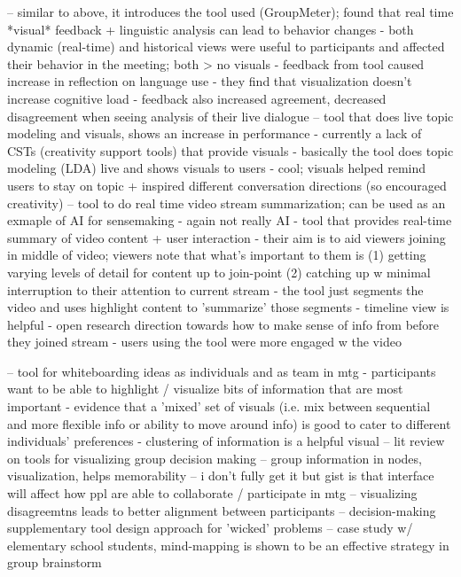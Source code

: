 \cite{leshedVisualizingRealtimeLanguagebased2009} -- similar to above, it introduces the tool used (GroupMeter); found that real time *visual* feedback + linguistic analysis can lead to behavior changes
    - both dynamic (real-time) and historical views were useful to participants and affected their behavior in the meeting; both > no visuals
    - feedback from tool caused increase in reflection on language use
    - they find that visualization doesn't increase cognitive load
    - feedback also increased agreement, decreased disagreement when seeing analysis of their live dialogue 
\cite{valkIdeationCompassSupporting2022} -- tool that does live topic modeling and visuals, shows an increase in performance
    - currently a lack of CSTs (creativity support tools) that provide visuals
    - basically the tool does topic modeling (LDA) live and shows visuals to users
    - cool; visuals helped remind users to stay on topic + inspired different conversation directions (so encouraged creativity)
\cite{yangCatchLiveRealtimeSummarization2022} -- tool to do real time video stream summarization; can be used as an exmaple of AI for sensemaking 
    - again not really AI
    - tool that provides real-time summary of video content + user interaction
    - their aim is to aid viewers joining in middle of video; viewers note that what's important to them is (1) getting varying levels of detail for content up to join-point (2) catching up w minimal interruption to their attention to current stream 
    - the tool just segments the video and uses highlight content to 'summarize' those segments
    - timeline view is helpful 
    - open research direction towards how to make sense of info from before they joined stream
    - users using the tool were more engaged w the video

\cite{gumiennySupportingSynthesisInformation2014} -- tool for whiteboarding ideas as individuals and as team in mtg
    - participants want to be able to highlight / visualize bits of information that are most important
    - evidence that a 'mixed' set of visuals (i.e. mix between sequential and more flexible info or ability to move around info) is good to cater to different individuals' preferences
    - clustering of information is a helpful visual
\cite{hindalongAbstractionsVisualizingPreferences2022} -- lit review on tools for visualizing group decision making
\cite{HowDisplayGroup} -- group information in nodes, visualization, helps memorability
\cite{kontogiorgosGroundingBehavioursConversational2021} -- i don't fully get it but gist is that interface will affect how ppl are able to collaborate / participate in mtg
\cite{liuConsensUsSupportingMultiCriteria2018} -- visualizing disagreemtns leads to better alignment between participants
\cite{mackenzieWisdomDecisionSupport2006} -- decision-making supplementary tool design approach for 'wicked' problems
\cite{sunHowStudentsGenerate2022} -- case study w/ elementary school students, mind-mapping is shown to be an effective strategy in group brainstorm

